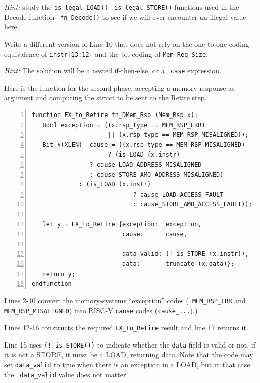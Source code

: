 \emph{Hint:} study the {\tt is\_legal\_LOAD()} {\tt
is\_legal\_STORE()} functions used in the Decode function {\tt
fn\_Decode()} to see if we will ever encounter an illegal value here.

\Exercise

Write a different version of Line 10 that does not rely on the
one-to-one coding equivalence of {\tt instr[13:12]} and the bit coding
of {\tt Mem\_Req\_Size}.

\emph{Hint:} The solution will be a nested if-then-else, or a {\tt
case} expression.

\Endexercise

Here is the function for the second phase, accepting a memory response
as argument and computing the struct to be sent to the Retire step.

{\small
\begin{Verbatim}[frame=single, numbers=left]
function EX_to_Retire fn_DMem_Rsp (Mem_Rsp x);
   Bool exception = ((x.rsp_type == MEM_RSP_ERR)
                     || (x.rsp_type == MEM_RSP_MISALIGNED));
   Bit #(XLEN)  cause = ((x.rsp_type == MEM_RSP_MISALIGNED)
       		      	 ? (is_LOAD (x.instr)
			    ? cause_LOAD_ADDRESS_MISALIGNED
			    : cause_STORE_AMO_ADDRESS_MISALIGNED)
			 : (is_LOAD (x.instr)
                            ? cause_LOAD_ACCESS_FAULT
                            : cause_STORE_AMO_ACCESS_FAULT));

   let y = EX_to_Retire {exception:  exception,
                         cause:      cause,

                         data_valid: (! is_STORE (x.instr)),
                         data:       truncate (x.data)};
   return y;
endfunction
\end{Verbatim}
}

Lines 2-10 convert the memory-systems ``exception'' codes ({\tt
MEM\_RSP\_ERR} and {\tt MEM\_RSP\_MISALIGNED}) into RISC-V {\tt cause}
codes ({\tt cause\_...}).)

Lines 12-16 constructs the required {\tt EX\_to\_Retire} result and
line 17 returns it.

Line 15 uses {\tt (!~is\_STORE())} to indicate whether the {\tt data}
field is valid or not, {\ie} if it is not a STORE, it must be a LOAD,
returning data.  Note that the code may set {\tt data\_valid} to true
when there is an exception in a LOAD, but in that case the {\tt
data\_valid} value does not matter.

\hdivider

\Exercise

